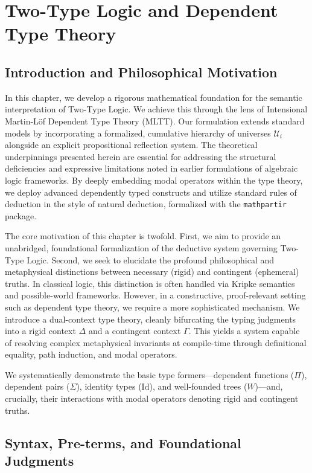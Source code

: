 \chapter{Two-Type Logic and Dependent Type Theory}
\label{ch:two_type_logic}

\section{Introduction and Philosophical Motivation}

In this chapter, we develop a rigorous mathematical foundation for the semantic interpretation of Two-Type Logic. We achieve this through the lens of Intensional Martin-L\"of Dependent Type Theory (MLTT). Our formulation extends standard models by incorporating a formalized, cumulative hierarchy of universes $\mathcal{U}_i$ alongside an explicit propositional reflection system. The theoretical underpinnings presented herein are essential for addressing the structural deficiencies and expressive limitations noted in earlier formulations of algebraic logic frameworks. By deeply embedding modal operators within the type theory, we deploy advanced dependently typed constructs and utilize standard rules of deduction in the style of natural deduction, formalized with the \texttt{mathpartir} package.

The core motivation of this chapter is twofold. First, we aim to provide an unabridged, foundational formalization of the deductive system governing Two-Type Logic. Second, we seek to elucidate the profound philosophical and metaphysical distinctions between necessary (rigid) and contingent (ephemeral) truths. In classical logic, this distinction is often handled via Kripke semantics and possible-world frameworks. However, in a constructive, proof-relevant setting such as dependent type theory, we require a more sophisticated mechanism. We introduce a dual-context type theory, cleanly bifurcating the typing judgments into a rigid context $\Delta$ and a contingent context $\Gamma$. This yields a system capable of resolving complex metaphysical invariants at compile-time through definitional equality, path induction, and modal operators. 

We systematically demonstrate the basic type formers—dependent functions ($\Pi$), dependent pairs ($\Sigma$), identity types ($\mathrm{Id}$), and well-founded trees ($W$)—and, crucially, their interactions with modal operators denoting rigid and contingent truths.

\section{Syntax, Pre-terms, and Foundational Judgments}

